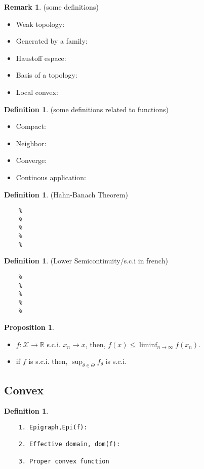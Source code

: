 \documentclass[letterpaper, 11pt]{article}
\let\mc\mathcal
\newcommand{\R}{\mathbb{R}}   %
\newcommand{\1}{\mathds{1}}	%
\theoremstyle{definition}
\newtheorem{proposition}[theorem]{Proposition}
\newtheorem{definition}[theorem]{Definition}
\newtheorem{remark}[theorem]{Remark}
\begin{document}
\begin{remark}{(some definitions)}
    \begin{itemize}
        \item Weak topology:
        \item Generated by a family:
        \item Haustoff espace:
        \item Basis of a topology:
        \item Local convex:
    \end{itemize}
\end{remark}
\begin{definition}{(some definitions related to functions)}
    \begin{itemize}
        \item Compact:
        \item Neighbor:
        \item Converge:
        \item Continous application: 
    \end{itemize}
\end{definition}

\begin{definition}{(Hahn-Banach Theorem)}
\end{definition}
\begin{lstlisting}
    %
    %
    %
    %
    %
\end{lstlisting}

\begin{definition}{(Lower Semicontinuity/s.c.i in french)}
\end{definition}
\begin{lstlisting}
    %
    %
    %
    %
    %
\end{lstlisting}

\begin{proposition}
    \begin{itemize}
        \item $f: \mc{X} \rightarrow \R$ s.c.i. $x_{n} \rightarrow x$, then, $f(x) \leq \liminf_{n \rightarrow \infty} f(x_{n})$.
        \item if $f$ is s.c.i. then, $\sup_{\theta \in \Theta} f_{\theta}$ is s.c.i.
    \end{itemize}
\end{proposition}

\subsection{Convex}
\begin{definition}
\end{definition}
\begin{lstlisting}
    1. Epigraph,Epi(f):

    2. Effective domain, dom(f):

    3. Proper convex function
\end{lstlisting}
\end{document}
